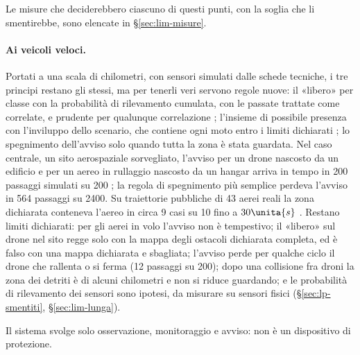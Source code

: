 Le misure che deciderebbero ciascuno di questi punti, con la soglia che li smentirebbe, sono elencate in \S\ref{sec:lim-misure}.

\paragraph{Ai veicoli veloci.} Portati a una scala di chilometri, con sensori simulati dalle schede tecniche, i tre principi restano gli stessi, ma per tenerli veri servono regole nuove: il «libero» per classe con la probabilità di rilevamento cumulata, con le passate trattate come correlate, e prudente per qualunque correlazione ; l'insieme di possibile presenza con l'inviluppo dello scenario, che contiene ogni moto entro i limiti dichiarati ; lo spegnimento dell'avviso solo quando tutta la zona è stata guardata. Nel caso centrale, un sito aerospaziale sorvegliato, l'avviso per un drone nascosto da un edificio e per un aereo in rullaggio nascosto da un hangar arriva in tempo in 200 passaggi simulati su 200 ; la regola di spegnimento più semplice perdeva l'avviso in 564 passaggi su 2400. Su traiettorie pubbliche di 43 aerei reali la zona dichiarata conteneva l'aereo in circa 9 casi su 10 fino a $30\unita{s}$ .
Restano limiti dichiarati: per gli aerei in volo l'avviso non è tempestivo; il «libero» sul drone nel sito regge solo con la mappa degli ostacoli dichiarata completa, ed è falso con una mappa dichiarata e sbagliata; l'avviso perde per qualche ciclo il drone che rallenta o si ferma (12 passaggi su 200); dopo una collisione fra droni la zona dei detriti è di alcuni chilometri e non si riduce guardando; e le probabilità di rilevamento dei sensori sono ipotesi, da misurare su sensori fisici (\S\ref{sec:lp-smentiti}, \S\ref{sec:lim-lunga}).

Il sistema svolge solo osservazione, monitoraggio e avviso: non è un dispositivo di protezione.
